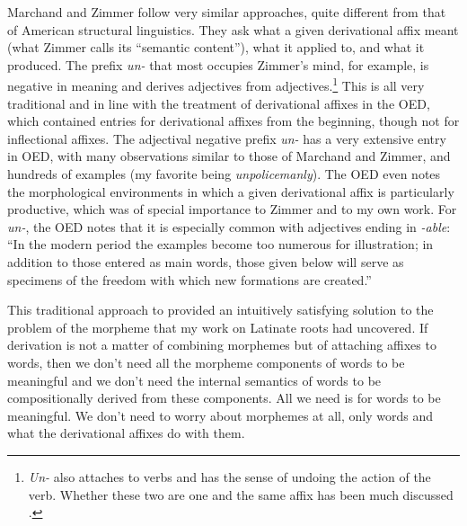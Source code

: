 \documentclass[output=paper]{langsci/langscibook}
\begin{document}
\newpage 
Marchand and Zimmer follow very similar approaches, quite
different from that of American structural linguistics. They ask what a
given derivational affix meant (what Zimmer calls its ``semantic
content''), what it applied to, and what it produced. The prefix
\emph{un-} that most occupies Zimmer's mind, for example, is negative in
meaning and derives adjectives from adjectives.\footnote{\emph{Un-} also
  attaches to verbs and has the sense of undoing the action of the verb.
  Whether these two are one and the same affix has been much discussed
\citep{Horn84}%
.} This is all very traditional and in line with the treatment
of derivational affixes in the OED, which contained entries for
derivational affixes from the beginning, though not for inflectional
affixes. The adjectival negative prefix \emph{un-} has a very extensive
entry in OED, with many observations similar to those of Marchand and
Zimmer, and hundreds of examples (my favorite being
\emph{unpolicemanly}). The OED even notes the morphological environments
in which a given derivational affix is particularly productive, which
was of special importance to Zimmer and to my own work. For \mbox{\emph{un-},}
the OED notes that it is especially common with adjectives ending in
\emph{-able}: ``In the modern period the examples become too numerous
for illustration; in addition to those entered as main words, those
given below will serve as specimens of the freedom with which new
formations are created.''

This traditional approach to  provided an intuitively
satisfying solution to the problem of the morpheme that my work on
Latinate roots had uncovered. If derivation is not a matter of combining
morphemes but of attaching affixes to words, then we don't need all the
morpheme components of words to be meaningful and we don't need the
internal semantics of words to be compositionally derived from these
components. All we need is for words to be meaningful. We don't need to
worry about morphemes at all, only words and what the derivational
affixes do with them.
\end{document}
